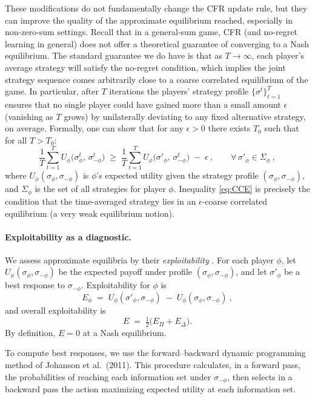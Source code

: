 \documentclass{article}
\begin{document}
These modifications do not fundamentally change the CFR update rule, but they can improve the quality of the approximate equilibrium reached, especially in non-zero-sum settings. Recall that in a general-sum game, CFR (and no-regret learning in general) does not offer a theoretical guarantee of converging to a Nash equilibrium. The standard guarantee we do have is that as $T\to\infty$, each player’s average strategy will satisfy the no-regret condition, which implies the joint strategy sequence comes arbitrarily close to a coarse correlated equilibrium of the game. In particular, after $T$ iterations the players’ strategy profile $\{\sigma^t\}_{t=1}^T$ ensures that no single player could have gained more than a small amount $\epsilon$ (vanishing as $T$ grows) by unilaterally deviating to any fixed alternative strategy, on average. Formally, one can show that for any $\epsilon>0$ there exists $T_0$ such that for all $T>T_0$: 
\begin{equation}\label{eq:CCE}
\frac{1}{T}\sum_{t=1}^T U_\phi\!\big(\sigma^t_{\phi},\,\sigma^t_{-\phi}\big)\;\ge\;\frac{1}{T}\sum_{t=1}^T U_\phi\!\big(\sigma'_{\phi},\,\sigma^t_{-\phi}\big)\;-\;\epsilon~,\qquad \forall\, \sigma'_{\phi}\in\Sigma_\phi~,
\end{equation}
where $U_\phi(\sigma_\phi,\sigma_{-\phi})$ is $\phi$’s expected utility given the strategy profile $(\sigma_\phi,\sigma_{-\phi})$, and $\Sigma_\phi$ is the set of all strategies for player $\phi$. Inequality \eqref{eq:CCE} is precisely the condition that the time-averaged strategy lies in an $\epsilon$-coarse correlated equilibrium (a very weak equilibrium notion). 
\paragraph{Exploitability as a diagnostic.} 
We assess approximate equilibria by their \emph{exploitability} 
\cite{lanctot2013,johanson2011}. For each player $\phi$, let 
$U_\phi(\sigma_\phi,\sigma_{-\phi})$ be the expected payoff under profile 
$(\sigma_\phi,\sigma_{-\phi})$, and let $\sigma'_\phi$ be a best response to 
$\sigma_{-\phi}$. Exploitability for $\phi$ is
\[
E_\phi \;=\; U_\phi(\sigma'_\phi,\sigma_{-\phi}) \;-\; 
             U_\phi(\sigma_\phi,\sigma_{-\phi})~,
\]
and overall exploitability is 
\[
E \;=\; \tfrac{1}{2}\big(E_{\Pi}+E_{\Delta}\big).
\]
By definition, $E=0$ at a Nash equilibrium. 

To compute best responses, we use the forward–backward dynamic programming 
method of Johanson et al.\ (2011). This procedure calculates, in a forward pass, 
the probabilities of reaching each information set under $\sigma_{-\phi}$, then 
selects in a backward pass the action maximizing expected utility at each 
information set. 
\end{document}
